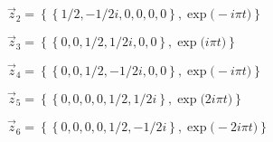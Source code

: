\(\vec z_{2}=\left\{
\left\{
1/2 , -1/2 i , 0 , 0 , 0 , 0
\right\} , \exp \big(-i \pi  t\big)
\right\}
\)\par

\(\vec z_{3}=\left\{
\left\{
0 , 0 , 1/2 , 1/2 i , 0 , 0
\right\} , \exp \big(i \pi  t\big)
\right\}
\)\par

\(\vec z_{4}=\left\{
\left\{
0 , 0 , 1/2 , -1/2 i , 0 , 0
\right\} , \exp \big(-i \pi  t\big)
\right\}
\)\par

\(\vec z_{5}=\left\{
\left\{
0 , 0 , 0 , 0 , 1/2 , 1/2 i
\right\} , \exp \big(2 i \pi  t\big)
\right\}
\)\par

\(\vec z_{6}=\left\{
\left\{
0 , 0 , 0 , 0 , 1/2 , -1/2 i
\right\} , \exp \big(-2 i \pi  t\big)
\right\}
\)\par
